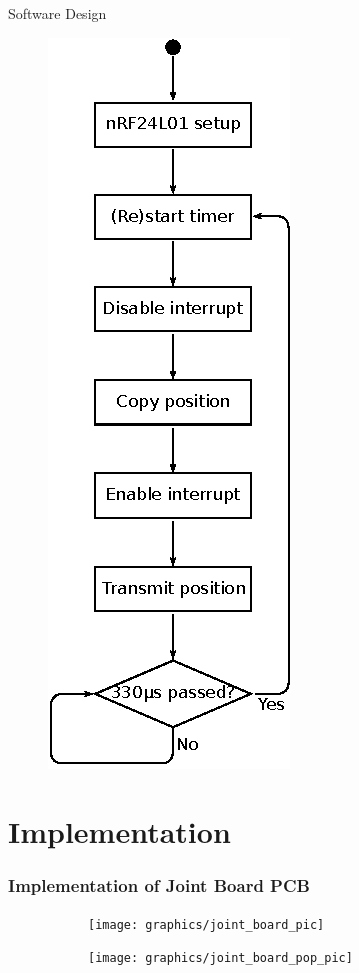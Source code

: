 \documentclass[mathserif]{beamer}
\begin{document}
\begin{frame}{Software Design}
	\begin{figure}
	\centering
	  \includegraphics[width=.25\linewidth]{graphics/joint_software_diagram}
	\end{figure}
\end{frame}





\section{Implementation}

\begin{frame}[c]\frametitle{Implementation of Joint Board PCB}
\begin{figure}
	\centering
	\begin{subfigure}{.5\textwidth}
	  \centering
	  \texttt{[image: graphics/joint\_board\_pic]}
	\end{subfigure}%
	\begin{subfigure}{.5\textwidth}
	  \centering
	  \texttt{[image: graphics/joint\_board\_pop\_pic]}
	\end{subfigure}
	\end{figure}
\end{frame}
\end{document}
